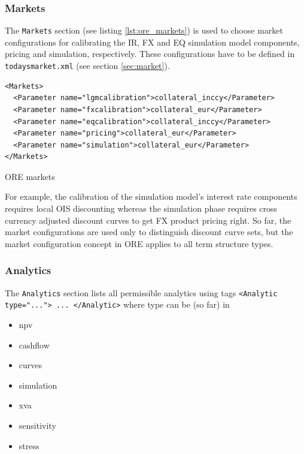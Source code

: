 \documentclass[12pt, a4paper]{article}
\begin{document}
\subsubsection{Markets}\label{sec:master_input_markets}

The {\tt Markets} section (see listing \ref{lst:ore_markets}) is used to choose market configurations for calibrating
the IR, FX and EQ simulation model components, pricing and simulation, respectively. These configurations have to be 
defined
in {\tt todaysmarket.xml} (see section \ref{sec:market}).

\begin{listing}[H]
\begin{verbatim}
<Markets>
  <Parameter name="lgmcalibration">collateral_inccy</Parameter>
  <Parameter name="fxcalibration">collateral_eur</Parameter>
  <Parameter name="eqcalibration">collateral_inccy</Parameter>
  <Parameter name="pricing">collateral_eur</Parameter>
  <Parameter name="simulation">collateral_eur</Parameter>
</Markets>
\end{verbatim}
\caption{ORE markets}
\label{lst:ore_markets}
\end{listing}

For example, the calibration of the simulation model's interest rate components requires local OIS discounting whereas
the simulation phase requires cross currency adjusted discount curves to get FX product pricing right. So far, the
market configurations are used only to distinguish discount curve sets, but the market configuration concept in ORE
applies to all term structure types.

\subsubsection{Analytics}\label{sec:analytics}

The {\tt Analytics} section lists all permissible analytics using tags {\tt <Analytic type="..."> ... </Analytic>} where
type can be (so far) in
\begin{itemize}
\item npv
\item cashflow
\item curves
\item simulation
\item xva
\item sensitivity
\item stress
\end{itemize}
\end{document}
